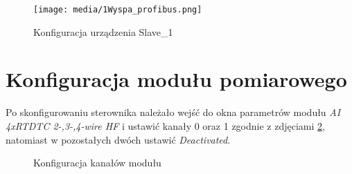 \documentclass{article}
\begin{document}
\begin{figure}[H]
    \centering
    \texttt{[image: media/1Wyspa\_profibus.png]}
    \caption{Konfiguracja urządzenia Slave\_1}
    \label{fig:slave1}    
\end{figure}

\section{Konfiguracja modułu pomiarowego}

Po skonfigurowaniu sterownika należało wejść do okna parametrów modułu \textit{AI 4xRTD\/TC 2-,3-,4-wire HF} i ustawić kanały 0 oraz 1 zgodnie z zdjęciami \ref {fig:main}, natomiast w pozostałych dwóch ustawić \textit{Deactivated}.



\begin{figure}[!ht]
    \centering
        \hfill
    \caption{Konfiguracja kanałów modułu}
    \label{fig:main}
\end{figure}
\end{document}
